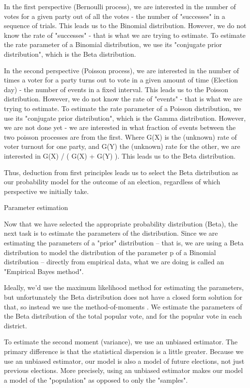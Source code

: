 \documentclass[preprint,12pt]{article}
\begin{document}
In the first perspective (Bernoulli process), we are interested in the number of votes for a given party out of all the votes - the number of "successes" in a sequence of trials.  This leads us to the Binomial distribution.  However, we do not know the rate of "successes" - that is what we are trying to estimate.  To estimate the rate parameter of a Binomial distribution, we use its "conjugate prior distribution", which is the Beta distribution.
 
In the second perspective (Poisson process), we are interested in the number of times a voter for a party turns out to vote in a given amount of time (Election day) - the number of events in a fixed interval. This leads us to the Poisson distribution.  However, we do not know the rate of "events" - that is what we are trying to estimate.  To estimate the rate parameter of a Poisson distribution, we use its "conjugate prior distribution", which is the Gamma distribution.  However, we are not done yet - we are interested in what fraction of events between the two poisson processes are from the first.  Where G(X) is the (unknown) rate of voter turnout for one party, and G(Y) the (unknown) rate for the other, we are interested in G(X) / ( G(X) + G(Y) ).  This leads us to the Beta distribution.
 
Thus, deduction from first principles leads us to select the Beta distribution as our probability model for the outcome of an election, regardless of which perspective we initially take.
 
Parameter estimation
 
Now that we have selected the appropriate probability distribution (Beta), the next task is to estimate the parameters of the distribution.  Since we are estimating the parameters of a "prior" distribution -- that is, we are using a Beta distribution to model the distribution of the parameter p of a Binomial distribution -- directly from empirical data, what we are doing is called an "Empirical Bayes method".
 
Ideally, we'd use the maximum likelihood method for estimating the parameters, but unfortunately the Beta distribution does not have a closed form solution for that, so instead we use the method-of-moments .  We estimate the parameters of the Beta distribution of the total popular vote, and for the popular vote in each district.  
 
To estimate the second moment (variance), we use an unbiased estimator.  The primary difference is that the statistical dispersion is a little greater.  Because we use an unbiased estimator, our model is also a model of future elections, not just previous elections.  More precisely, using an unbiased estimator makes our model a model of the "population" as opposed to only the "samples".
 
\end{document}
